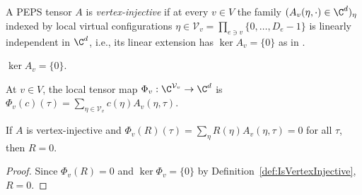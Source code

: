 \begin{definition}%
    \label{def:IsVertexInjective}
    \leanok
    A PEPS tensor $A$ is \emph{vertex-injective} if at every $v\in V$ the family
    $(A_v(\eta,\cdot)\in\C^d)_{\eta}$ indexed by local virtual configurations
    $\eta\in\mathcal V_v=\prod_{e\ni v}\{0,\ldots,D_e-1\}$ is linearly
    independent in $\C^d$, i.e., its linear extension has $\ker A_v=\{0\}$ as in
    \cite[Section~3]{Molnar2018NormalPEPS}.
    \begin{center}
        \tenkzkernel
        \begin{tenkz}[rows={wire}, cols=1, bonds=none]
        \end{tenkz}
        \qquad $\ker A_v=\{0\}$.
    \end{center}
\end{definition}

\begin{definition}%
    \label{def:peps_localTensorMap}
    \leanok
    At $v\in V$, the local tensor map $\Phi_v:\C^{\mathcal V_v}\to\C^d$ is
    $\Phi_v(c)(\tau)=\sum_{\eta\in\mathcal V_v}c(\eta)A_v(\eta,\tau)$.
\end{definition}

\begin{lemma}%
    \label{lem:peps_localCoeff_eq_zero_of_contract_zero}
    \leanok
    If $A$ is vertex-injective and $\Phi_v(R)(\tau)=\sum_{\eta}R(\eta)A_v(\eta,\tau)=0$
    for all $\tau$, then $R=0$.
\end{lemma}
\begin{proof}\leanok
    Since $\Phi_v(R)=0$ and $\ker\Phi_v=\{0\}$ by
    Definition~\ref{def:IsVertexInjective}, $R=0$.
\end{proof}

